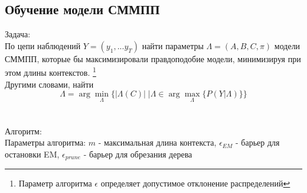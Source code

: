 \documentclass{matmex-diploma-custom}
\begin{document}
\subsection{Обучение модели СММПП}
{\large Задача:} 
\\
По цепи наблюдений $ Y = (y_{1}, ... y_{T}) $ найти параметры $\Lambda = (A,B,C,\pi)$ модели СММПП, которые бы максимизировали правдоподобие модели, минимизируя при этом длины контекстов. 
\footnote{Параметр алгоритма $ \epsilon $ определяет допустимое отклонение распределений}
\\
Другими словами, найти
\\
$$\Lambda = \arg\!\min_{\Lambda}{\{|\Lambda(C)|\;|\Lambda \in \arg\!\max_{\Lambda}{\{P(Y|\Lambda)\}}\}}$$
\\\\
{\large Алгоритм:}
\\
Параметры алгоритма: 
$ m $ - максимальная длина контекста, 
$ \epsilon_{EM} $ - барьер для остановки EM,
$ \epsilon_{prune} $ - барьер для обрезания дерева
\\
\end{document}
